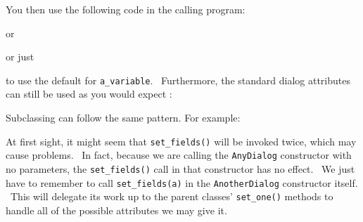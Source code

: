 You then use the following code in the calling program:


or


or just


\noindent to use the default for \texttt{a\_variable}. \ Furthermore, the standard
dialog attributes can still be used as you would expect :


Subclassing can follow the same pattern. For example:


At first sight, it might seem that \texttt{set\_fields()} will be
invoked twice, which may cause problems. \ In fact, because we are
calling the \texttt{AnyDialog} constructor with no parameters, the
\texttt{set\_fields()} call in that constructor has no effect. \ We
just have to remember to call \texttt{set\_fields(a)} in the
\texttt{AnotherDialog} constructor itself. \ This will delegate its
work up to the parent classes' \texttt{set\_one()}
methods to handle all of the possible attributes we may give it.

